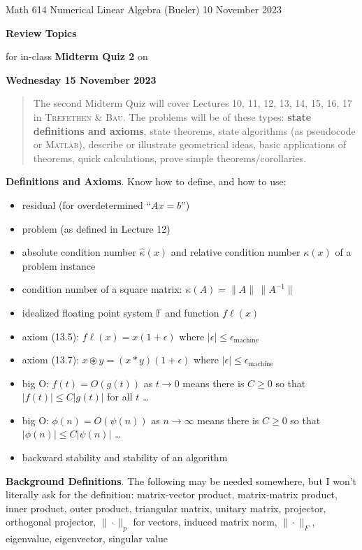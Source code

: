\documentclass[11pt]{amsart}
\newcommand{\normalspacing}{\renewcommand{\baselinestretch}{1.1}\tiny\normalsize}
\newcommand{\bigspacing}{\renewcommand{\baselinestretch}{1.21}\tiny\normalsize}
\newcommand{\FF}{{\mathbb{F}}}
\newcommand{\eps}{\epsilon}
\newcommand{\Matlab}{\textsc{Matlab}\xspace}
\newcommand{\emach}{\eps_{\text{machine}}}
\newcommand{\fl}{f\ell}
\newcommand{\textbook}{\textsc{Trefethen \& Bau}}
\begin{document}
\scriptsize \noindent Math 614 Numerical Linear Algebra (Bueler) \hfill 10 November 2023
\thispagestyle{empty}

\bigskip
\Large\centerline{\textbf{Review Topics} }

\Large\centerline{for in-class \textbf{Midterm Quiz 2} on}

\Large\centerline{\textbf{Wednesday 15 November 2023}}

\normalsize
\bigskip
\normalspacing
\begin{quote}
The second Midterm Quiz will cover Lectures 10, 11, 12, 13, 14, 15, 16, 17 in \textbook.  The problems will be of these types: \textbf{state definitions and axioms}, state theorems, state algorithms (as pseudocode or \Matlab), describe or illustrate geometrical ideas, basic applications of theorems, quick calculations, prove simple theorems/corollaries.
\end{quote}
\bigskip

\medskip
\noindent \textbf{Definitions and Axioms}. Know how to define, and how to use:
\begin{itemize}
\item residual (for overdetermined ``$Ax=b$'')
\item problem (as defined in Lecture 12)
\item absolute condition number $\hat\kappa(x)$ and relative condition number $\kappa(x)$ of a problem instance
\item condition number of a square matrix: $\kappa(A)=\|A\|\,\|A^{-1}\|$
\item idealized floating point system $\FF$ and function $\fl(x)$
\item axiom (13.5): \quad $\fl(x) = x (1+\eps)$ where $|\eps|\le \emach$
\item axiom (13.7): \quad $x \circledast y = (x \ast y) (1+\eps)$ where $|\eps|\le \emach$
\item big O: $f(t) = O(g(t))$ as $t\to 0$ means there is $C\ge 0$ so that $|f(t)| \le C |g(t)|$ for all $t$ \dots
\item big O: $\phi(n) = O(\psi(n))$ as $n\to \infty$ means there is $C\ge 0$ so that $|\phi(n)| \le C |\psi(n)|$ \dots
\item backward stability and stability of an algorithm
\end{itemize}

\bigspacing
\noindent \textbf{Background Definitions}.  The following may be needed somewhere, but I won't literally ask for the definition: matrix-vector product, matrix-matrix product, inner product, outer product, triangular matrix, unitary matrix, projector, orthogonal projector, $\|\cdot\|_p$ for vectors, induced matrix norm, $\|\cdot\|_F$, eigenvalue, eigenvector, singular value
\end{document}
